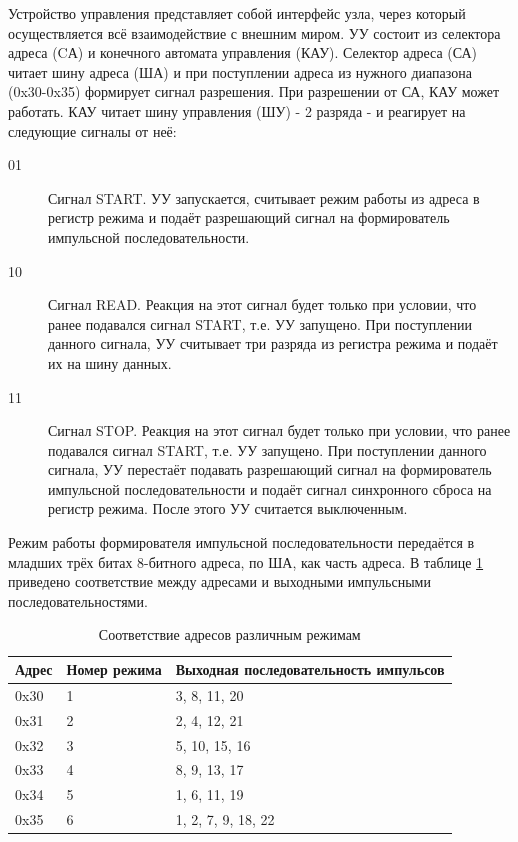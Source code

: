 Устройство управления представляет собой интерфейс узла, через который осуществляется всё взаимодействие с внешним миром. УУ состоит из селектора адреса (CА) и конечного автомата управления (КАУ). Селектор адреса (СА) читает шину адреса (ША) и при поступлении адреса из нужного диапазона (0x30-0x35) формирует сигнал разрешения. При разрешении от СА, КАУ может работать. КАУ читает шину управления (ШУ) - 2 разряда - и реагирует на следующие сигналы от неё:
\begin{description}
\item[01] Сигнал START. УУ запускается, считывает режим работы из адреса в регистр режима и подаёт разрешающий сигнал на формирователь импульсной последовательности.
\item[10] Сигнал READ. Реакция на этот сигнал будет только при условии, что ранее подавался сигнал START, т.е. УУ запущено. При поступлении данного сигнала, УУ считывает три разряда из регистра режима и подаёт их на шину данных.
\item[11] Сигнал STOP. Реакция на этот сигнал будет только при условии, что ранее подавался сигнал START, т.е. УУ запущено. При поступлении данного сигнала, УУ перестаёт подавать разрешающий сигнал на формирователь импульсной последовательности и подаёт сигнал синхронного сброса на регистр режима. После этого УУ считается выключенным.
\end{description}

Режим работы формирователя импульсной последовательности передаётся в младших трёх битах 8-битного адреса, по ША, как часть адреса. В таблице \ref{table:modes} приведено соответствие между адресами и выходными импульсными последовательностями.

\begin{table}[h]
  \centering
  \begin{tabular}{|l|l|l|}
    \hline
    Адрес & Номер режима & Выходная последовательность импульсов \\ \hline
    0x30 & 1 & 3, 8, 11, 20 \\ \hline
    0x31 & 2 & 2, 4, 12, 21 \\ \hline
    0x32 & 3 & 5, 10, 15, 16 \\ \hline
    0x33 & 4 & 8, 9, 13, 17 \\ \hline
    0x34 & 5 & 1, 6, 11, 19 \\ \hline
    0x35 & 6 & 1, 2, 7, 9, 18, 22 \\ \hline
  \end{tabular}
  \caption{Соответствие адресов различным режимам}
  \label{table:modes}
\end{table}

